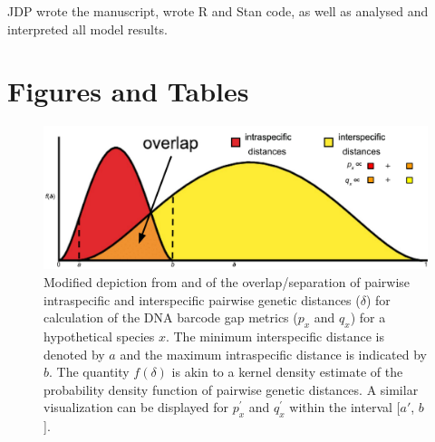 \documentclass[12pt]{article}
\begin{document}
JDP wrote the manuscript, wrote R and Stan code, as well as analysed and interpreted all model results. 




\section*{Figures and Tables}

\begin{figure}[H]

\centering

\includegraphics[width=1.0\textwidth]{Figure 1}

\caption{Modified depiction from \citet{meyer2005dna} and \citet{phillips2024measure} of the overlap/separation of pairwise intraspecific and interspecific pairwise genetic distances ($\delta$) for calculation of the DNA barcode gap metrics ($p_x$ and $q_x$) for a hypothetical species $x$. The minimum interspecific distance is denoted by $a$ and the maximum intraspecific distance is indicated by $b$. The quantity $f(\delta)$ is akin to a kernel density estimate of the probability density function of pairwise genetic distances. A similar visualization can be displayed for $p^{'}_x$ and $q^{'}_x$ within the interval [$a'$, $b$].}

\end{figure}
\end{document}
